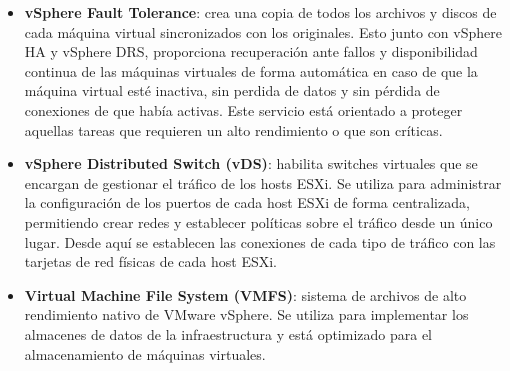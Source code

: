 \begin{itemize}
    \item \textbf{vSphere Fault Tolerance}: crea una copia de todos los archivos y discos de cada máquina virtual sincronizados con los originales. Esto junto con vSphere HA y vSphere DRS, proporciona recuperación ante fallos y  disponibilidad continua de las máquinas virtuales de forma automática en caso de que la máquina virtual esté inactiva, sin perdida de datos y sin pérdida de conexiones de que había activas. Este servicio está orientado a proteger aquellas tareas que requieren un alto rendimiento o que son críticas.

    \item \textbf{vSphere Distributed Switch (vDS)}: habilita switches virtuales que se encargan de gestionar el tráfico de los hosts ESXi. Se utiliza para administrar la configuración de los puertos de cada host ESXi de forma centralizada, permitiendo crear redes y establecer políticas sobre el tráfico desde un único lugar. Desde aquí se establecen las conexiones de cada tipo de tráfico con las tarjetas de red físicas de cada host ESXi.
    
    \item \textbf{Virtual Machine File System (VMFS)}: sistema de archivos de alto rendimiento nativo de VMware vSphere. Se utiliza para implementar los almacenes de datos de la infraestructura y está optimizado para el almacenamiento de máquinas virtuales.
    
\end{itemize}


